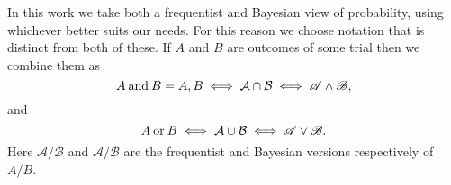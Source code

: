         In this work we take both a frequentist and Bayesian view of probability, using whichever better suits our needs.
        For this reason we choose notation that is distinct from both of these.
        If \(A\) and \(B\) are outcomes of some trial then we combine them as
        \[A\mathbin{\operatorname{and}} B = A, B \iff \mathcal{A} \cap \mathcal{B} \iff \mathscr{A} \wedge \mathscr{B},\]
        and
        \[A \mathbin{\operatorname{or}} B \iff \mathcal{A} \cup \mathcal{B} \iff \mathscr{A} \vee \mathscr{B}.\]
        Here \(\mathcal{A}/\mathcal{B}\) and \(\mathscr{A}/\mathscr{B}\) are the frequentist and Bayesian versions respectively of \(A/B\).